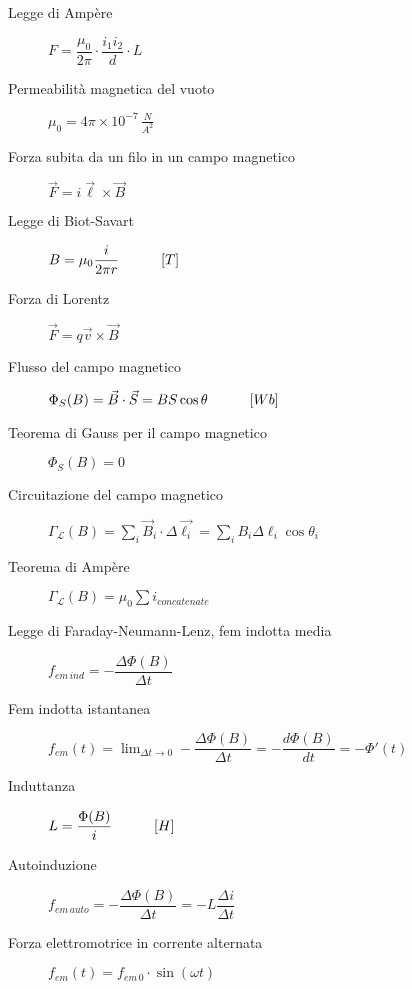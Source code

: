 \documentclass[a4paper,11pt,italian]{article}
\begin{document}
\begin{description}
  \item[Legge di Ampère]
  $ F = \dfrac{\mu_0}{2\pi} \cdot \dfrac{i_1 i_2}{d}\cdot L $
  
  \item[Permeabilità magnetica del vuoto]
  $ \mu_0 = 4\pi \times 10^{-7} \, \frac{N}{A^2} $
  
  \item[Forza subita da un filo in un campo magnetico] 
  $ \vec{F} = i\vec{\ell}\times\vec{B} $
  
  
  \item[Legge di Biot-Savart] 
  $ B = \mu_0\dfrac{i}{2\pi r} \hspace*{3em} [T] $
  
  \item[Forza di Lorentz] 
  $ \vec{F} = q \vec{v} \times \vec{B} $
  
  \item[Flusso del campo magnetico] 
  $ \Phi_S(B) = \vec{B} \cdot \vec{S} = B S \cos \theta \hspace*{3em} [Wb] $
  
  \item[Teorema di Gauss per il campo magnetico] 
  $ \Phi_S(B) = 0 $
  
  \item[Circuitazione del campo magnetico]\label{conc:circuitazioneB}
  $ \Gamma_\mathscr{L}(B) = \sum_i \vec{B}_i \cdot \Delta\vec{\ell_i} = \sum_i B_i \Delta \ell_i \cos \theta_i $
  
  \item[Teorema di Ampère] 
  $ \Gamma_\mathscr{L}(B) = \mu_0 \sum i_{concatenate} $
  
  \item[Legge di Faraday-Neumann-Lenz, fem indotta media] 
  $ f_{em \, ind} =  - \dfrac{\Delta \Phi(B)}{\Delta t} $
  
  \item[Fem indotta istantanea] 
  $ f_{em}(t) =  \displaystyle\lim_{\Delta t \rightarrow 0}- \dfrac{\Delta \Phi(B)}{\Delta t} = - \dfrac{d\Phi(B)}{dt} = - \Phi'(t) $
  
  
  \item[Induttanza] 
  $ L =  \dfrac{\Phi(B)}{i} \hspace*{3em} [H] $
  
  \item[Autoinduzione] 
  $ f_{em \, auto} =  - \dfrac{\Delta \Phi(B)}{\Delta t} = - L \dfrac{\Delta i}{\Delta t} $
  
  \item[Forza elettromotrice in corrente alternata]
  $ f_{em} (t)  = f_{em \, 0} \cdot \sin (\omega t) $
  

\end{description}
\end{document}
